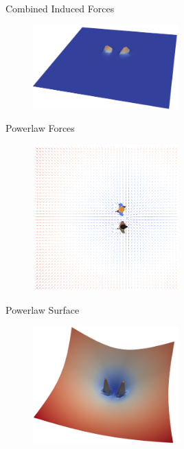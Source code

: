 \documentclass[aspectratio=169,xcolor=dvipsnames]{beamer}
\begin{document}
\begin{frame}{Combined Induced Forces}
  \begin{figure}
    \includegraphics[width=0.5\textwidth]{imgs/forces_surface.png}
  \end{figure}
\end{frame}

\begin{frame}{Powerlaw Forces}
  \begin{figure}
    \includegraphics[width=0.5\textwidth]{imgs/final_vel.png}
  \end{figure}
\end{frame}

\begin{frame}{Powerlaw Surface}
  \begin{figure}
    \includegraphics[width=0.5\textwidth]{imgs/final_vel_surface.png}
  \end{figure}
\end{frame}
\end{document}

